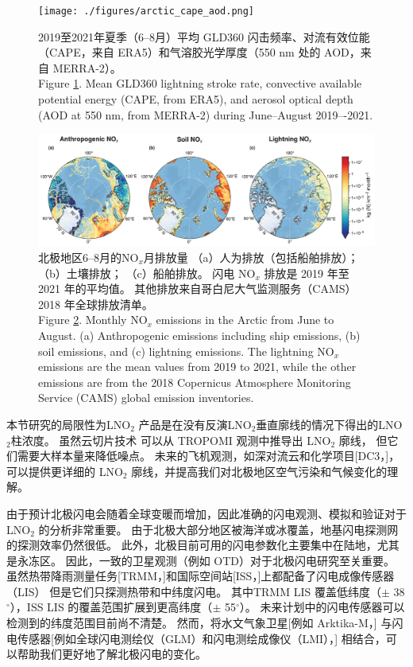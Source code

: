 \begin{figure}[!htbp]
\centering
\texttt{[image: ./figures/arctic\_cape\_aod.png]}
\caption{
2019至2021年夏季（6--8月）平均 GLD360 闪击频率、对流有效位能（CAPE，来自 ERA5）和气溶胶光学厚度（550 nm 处的 AOD，来自 MERRA-2）。\\
Figure \ref{fig:arctic_cape_aod}.
Mean GLD360 lightning stroke rate, convective available potential energy (CAPE, from ERA5), and aerosol optical depth (AOD at 550 nm, from MERRA-2) during June--August 2019–-2021.
}
\label{fig:arctic_cape_aod}
\end{figure}


\begin{figure}[!htbp]
\centering
\includegraphics[width=15cm]{./figures/arctic_emission_comp.png}
\caption{
北极地区6--8月的NO$_x$月排放量
（a）人为排放（包括船舶排放）；（b）土壤排放；
（c）船舶排放。
闪电 NO$_x$ 排放是 2019 年至 2021 年的平均值。
其他排放来自哥白尼大气监测服务（CAMS）2018 年全球排放清单。\\
Figure \ref{fig:arctic_emission_comp}. Monthly NO$_x$ emissions in the Arctic from June to August.
(a) Anthropogenic emissions including ship emissions, (b) soil emissions, and (c) lightning emissions.
The lightning NO$_x$ emissions are the mean values from 2019 to 2021, while the other emissions are from the 2018 Copernicus Atmosphere Monitoring Service (CAMS) global emission inventories.
}
\label{fig:arctic_emission_comp}
\end{figure}


本节研究的局限性为LNO$_2$ 产品是在没有反演LNO$_2$垂直廓线的情况下得出的LNO$_2$柱浓度。
虽然云切片技术 \citep{BelmonteRivas.2015,Marais.2021} 可以从 TROPOMI 观测中推导出 LNO$_2$ 廓线，
但它们需要大样本量来降低噪点。
未来的飞机观测，如深对流云和化学项目[DC3，\citet{Barth.2019}]，
可以提供更详细的 LNO$_2$ 廓线，并提高我们对北极地区空气污染和气候变化的理解\citep{Law.2007,Schmale.2018}。

由于预计北极闪电会随着全球变暖而增加，因此准确的闪电观测、模拟和验证对于 LNO$_2$ 的分析非常重要。
由于北极大部分地区被海洋或冰覆盖，地基闪电探测网的探测效率仍然很低\citep{Vagasky.2022}。
此外，北极目前可用的闪电参数化主要集中在陆地，尤其是永冻区\citep{Chen.2021a}。
因此，一致的卫星观测（例如 OTD）对于北极闪电研究至关重要。
虽然热带降雨测量任务[TRMM，\citet{Cecil.2014}]和国际空间站[ISS，\citet{Blakeslee.2020}]上都配备了闪电成像传感器（LIS）
但是它们只探测热带和中纬度闪电。
其中TRMM LIS 覆盖低纬度（$\pm$ 38$^{\circ}$），ISS LIS 的覆盖范围扩展到更高纬度（$\pm$ 55$^{\circ}$）。
未来计划中的闪电传感器可以检测到的纬度范围目前尚不清楚。
然而，将水文气象卫星[例如 Arktika-M，\citet{Asmus.2021}]
与闪电传感器[例如全球闪电测绘仪（GLM）和闪电测绘成像仪（LMI），\citet{Goodman.2013,Yang.2017}] 相结合，可以帮助我们更好地了解北极闪电的变化。


